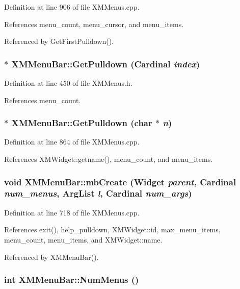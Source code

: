 Definition at line 906 of file XMMenus.cpp.

References menu\_\-count, menu\_\-cursor, and menu\_\-items.

Referenced by Get\-First\-Pulldown().
\subsubsection{$\ast$ XMMenu\-Bar::Get\-Pulldown (Cardinal {\em index})\hspace{0.3cm}{\tt  [inline]}}\label{classXMMenuBar_a7}




Definition at line 450 of file XMMenus.h.

References menu\_\-count.
\subsubsection{ $\ast$ XMMenu\-Bar::Get\-Pulldown (char $\ast$ {\em n})}\label{classXMMenuBar_a6}




Definition at line 864 of file XMMenus.cpp.

References XMWidget::getname(), menu\_\-count, and menu\_\-items.
\subsubsection{\setlength{\rightskip}{0pt plus 5cm}void XMMenu\-Bar::mb\-Create (Widget {\em parent}, Cardinal {\em num\_\-menus}, Arg\-List {\em l}, Cardinal {\em num\_\-args})\hspace{0.3cm}{\tt  [protected]}}\label{classXMMenuBar_b0}




Definition at line 718 of file XMMenus.cpp.

References exit(), help\_\-pulldown, XMWidget::id, max\_\-menu\_\-items, menu\_\-count, menu\_\-items, and XMWidget::name.

Referenced by XMMenu\-Bar().
\subsubsection{\setlength{\rightskip}{0pt plus 5cm}int XMMenu\-Bar::Num\-Menus ()\hspace{0.3cm}{\tt  [inline]}}\label{classXMMenuBar_a5}




